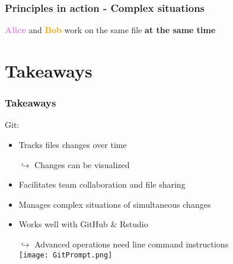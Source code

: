 \documentclass[xcolor=x11names,compress]{beamer}
\renewcommand{\(}{\begin{columns}}
\renewcommand{\)}{\end{columns}}
\newcommand{\<}[1]{\begin{column}{#1}}
\renewcommand{\>}{\end{column}}
\begin{document}
\begin{frame}
\frametitle{Principles in action - Complex situations}
\textcolor{violet}{\textbf{Alice}} and \textcolor{orange}{\textbf{Bob}} work on the same file \textbf{at the same time}
\pause
\begin{itemize}
\item[]
\end{itemize}
\end{frame}


\section{Takeaways}

\begin{frame}
\frametitle{Takeaways}
 Git: 
\begin{itemize}[<+->]
    \item Tracks files changes over time
    \item[$\hookrightarrow$] Changes can be visualized
    \item Facilitates team collaboration  and file sharing
    \item Manages complex situations of simultaneous changes
    \item Works well with GitHub \& Rstudio
    \item[$\hookrightarrow$] Advanced operations need line command instructions \\
    \texttt{[image: GitPrompt.png]} \\  
    \end{itemize}
\end{frame}
\end{document}
